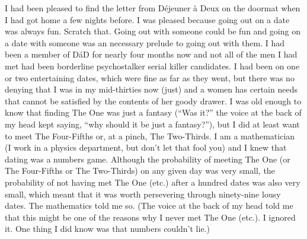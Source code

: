 
\twelverm
I had been pleased to find the letter from Déjeuner à Deux on the
doormat when I had got home a few nights before. I was pleased because
going out on a date was always fun. Scratch that. Going out with
someone could be fun and going on a date with someone was an necessary prelude to going
out with them. I had been a member of DáD for nearly four months now and not all of the men I
had met had been borderline psychostalker serial killer candidates.
I had been on one or two entertaining dates, which were fine as far as they went, but there was no denying that I was in my mid-thirties now (just) and a women has
certain needs that cannot be satisfied by the contents of her goody
drawer. I was old enough to know that
finding The One was just a fantasy (``Was it?'' the voice at the
back of my head kept saying, ``why should it be just a fantasy?''), but I did
at least want to meet The Four-Fifths or, at a pinch, The
Two-Thirds. I am a mathematician (I work in a physics department,
but don't let that fool you) and I knew that dating was a numbers
game. Although the probability of meeting The One (or The
Four-Fifths or The Two-Thirds) on any given day was very small, the
probability of not having met The One (etc.) after a hundred dates
was also very small, which meant that it was worth persevering through ninety-nine lousy dates. The mathematics
told me so. (The voice at the back of my head told me that this
might be one of the reasons why I never met The One (etc.). I
ignored it. One thing I did know was that numbers couldn't lie.)


